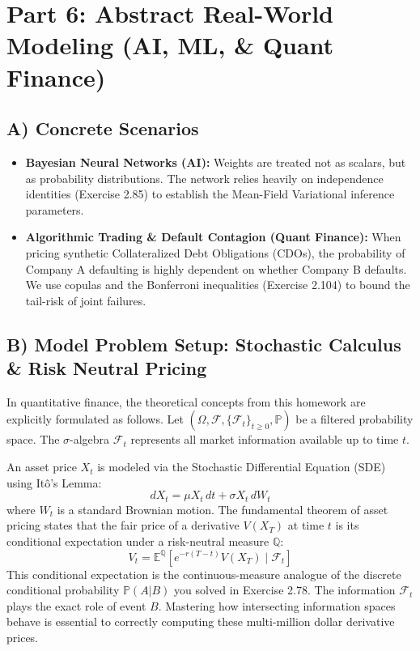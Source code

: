 \documentclass[11pt, letterpaper]{article}
\theoremstyle{definition}
\begin{document}
\section{Part 6: Abstract Real-World Modeling (AI, ML, \& Quant Finance)}

\subsection{A) Concrete Scenarios}
\begin{itemize}
    \item \textbf{Bayesian Neural Networks (AI):} Weights are treated not as scalars, but as probability distributions. The network relies heavily on independence identities (Exercise 2.85) to establish the Mean-Field Variational inference parameters.
    \item \textbf{Algorithmic Trading \& Default Contagion (Quant Finance):} When pricing synthetic Collateralized Debt Obligations (CDOs), the probability of Company A defaulting is highly dependent on whether Company B defaults. We use copulas and the Bonferroni inequalities (Exercise 2.104) to bound the tail-risk of joint failures.
\end{itemize}

\subsection{B) Model Problem Setup: Stochastic Calculus \& Risk Neutral Pricing}
In quantitative finance, the theoretical concepts from this homework are explicitly formulated as follows. Let $(\Omega, \mathscr{F}, \{\mathscr{F}_t\}_{t \geq 0}, \mathbb{P})$ be a filtered probability space. The $\sigma$-algebra $\mathscr{F}_t$ represents all market information available up to time $t$.

An asset price $X_t$ is modeled via the Stochastic Differential Equation (SDE) using Itô's Lemma:
\[ dX_t = \mu X_t \, dt + \sigma X_t \, dW_t \]
where $W_t$ is a standard Brownian motion. The fundamental theorem of asset pricing states that the fair price of a derivative $V(X_T)$ at time $t$ is its conditional expectation under a risk-neutral measure $\mathbb{Q}$:
\[ V_t = \mathbb{E}^{\mathbb{Q}}[e^{-r(T-t)} V(X_T) \mid \mathscr{F}_t] \]
This conditional expectation is the continuous-measure analogue of the discrete conditional probability $\mathbb{P}(A|B)$ you solved in Exercise 2.78. The information $\mathscr{F}_t$ plays the exact role of event $B$. Mastering how intersecting information spaces behave is essential to correctly computing these multi-million dollar derivative prices.
\end{document}
